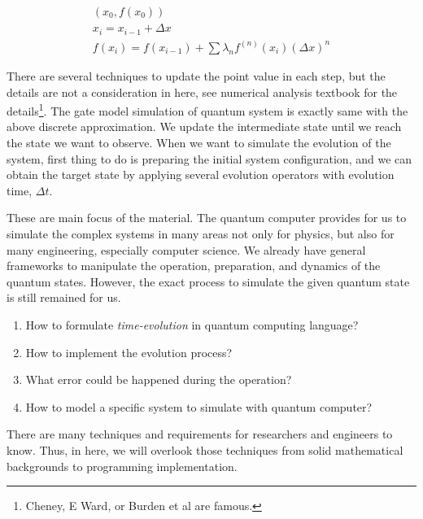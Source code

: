 \begin{align}
    (x_0, f(x_0)) \\
    x_i = x_{i-1} + \Delta x \\
    f(x_i) = f(x_{i-1}) + \sum \lambda_n f^{(n)}(x_i) (\Delta x)^n
\end{align}

There are several techniques to update the point value in each step, but the details are not a consideration in here, 
see numerical analysis textbook for the details\footnote[1]{Cheney, E Ward, or Burden et al are famous.}.
The gate model simulation of quantum system is exactly same with the above discrete approximation. 
We update the intermediate state until we reach the state we want to observe.
When we want to simulate the evolution of the system, first thing to do is preparing the initial system configuration, and 
we can obtain the target state by applying several evolution operators with evolution time, $\Delta t$.

These are main focus of the material. 
The quantum computer provides for us to simulate the complex systems in many areas 
not only for physics, but also for many engineering, especially computer science.
We already have general frameworks to manipulate the operation, preparation,
and dynamics of the quantum states. 
However, the exact process to simulate the given quantum state 
is still remained for us.

\begin{enumerate}
    \item How to formulate \textit{time-evolution} in quantum computing language?
    \item How to implement the evolution process?
    \item What error could be happened during the operation?
    \item How to model a specific system to simulate with quantum computer?
\end{enumerate}

There are many techniques and requirements for researchers and engineers to know.
Thus, in here, we will overlook those techniques
from solid mathematical backgrounds to programming implementation.
